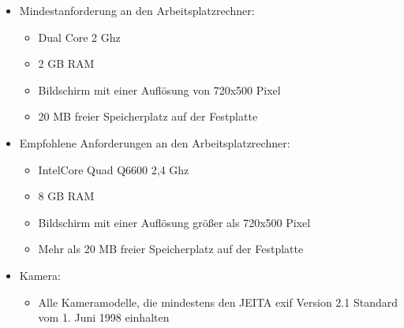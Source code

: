 	\begin{itemize}
		
		\item Mindestanforderung an den Arbeitsplatzrechner: 
		
			\begin{itemize}
			
				\item Dual Core 2 Ghz
				
				\item 2 GB RAM
			
				\item Bildschirm mit einer Auflösung von 720x500 Pixel
			
				\item 20 MB freier Speicherplatz auf der Festplatte
			
			\end{itemize}
	
		\item Empfohlene Anforderungen an den Arbeitsplatzrechner:
	
			\begin{itemize}
			
				\item Intel\textregistered Core Quad Q6600 2,4 Ghz
				
				\item 8 GB RAM
				
				\item Bildschirm mit einer Auflösung größer als 720x500 Pixel
				
				\item Mehr als 20 MB freier Speicherplatz auf der Festplatte
			
			\end{itemize}	
	
		\item Kamera:

			\begin{itemize}

				\item Alle Kameramodelle, die mindestens den JEITA \gls{exif} Version 2.1 Standard vom 1. Juni 1998 einhalten

			\end{itemize}
		
	\end{itemize}